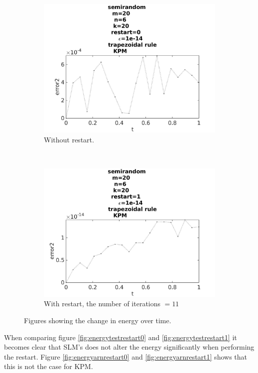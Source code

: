 \begin{figure}[H]
        \begin{subfigure}[b]{0.45\textwidth}
                \includegraphics[width=\textwidth]{../MATLAB/fig/errorarnrestart02.jpg}
                \caption{  Without restart. }
                \label{fig:energyarnrestart02}
        \end{subfigure}%
        ~
        \begin{subfigure}[b]{0.45\textwidth}
                \includegraphics[width=\textwidth]{../MATLAB/fig/errorarnrestart12.jpg}
                \caption{ With restart, the number of iterations $ = 11$ }
                \label{fig:energyarnrestart12}
        \end{subfigure}
        \caption{ Figures showing the change in energy over time. }
        \label{fig:energyarnrestart2}
\end{figure}

When comparing figure \ref{fig:energytestrestart0} and \ref{fig:energytestrestart1} it becomes clear that SLM's does not alter the energy significantly when performing the restart. Figure \ref{fig:energyarnrestart0} and \ref{fig:energyarnrestart1} shows that this is not the case for KPM.\\